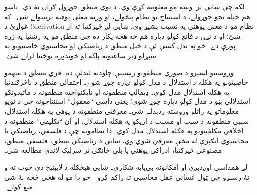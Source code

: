 \documentclass[../../../include/open-logic-section]{subfiles}
\begin{document}


لکه چې ښايي تر اوسه مو معلومه کړې وي، د نوي منطق جوړول ګران نۀ دي۔
تاسو هم خپله نحو جوړولے، د استنتاج يو نظام پنځولے، او ورته معنٰی پوهنه
ترتيبولے شئ۔ که غواړئ د !!{derivation} نظام مو د معنٰی پوهنې په نسبت
بشپړ وي، ښايي لږ ځيرکتيا ته اړ شئ؛ او د نړۍ د قانع کولو دپاره هم څه
هڅه پکار ده چې منطق مو په رښتيا په زړه پورې دے۔ خو په بدل کښې ئې د
خپل منطق د رياضيکي او محاسبوي خاصيتونو په سپړلو ډېر ساعتونه پاکه او
خوندوره بوختيا لرلے شئ۔

وروستيو لسيزو د صوري منطقونو رښتينې چاودنه ليدلې ده۔ فزي منطق د
مبهمو خاصيتونو په هکله د استدلال د مدل کولو دپاره جوړ شوے۔ احتمالي
منطق د ناڅرګندتيا په هکله استدلال مدل کوي۔ ډيفالټ منطقونه او
نايکنواخته منطقونه د ماتېدونکو استدلالي بڼو د مدل کولو دپاره جوړ شوي؛
يعنې داسې ``معقول'' استنتاجونه چې د نويو معلوماتو په راتلو وروسته
ردېدلے شي۔ معرفتي منطقونه د پوهې په هکله استدلال، سببي منطقونه د سبب
او مسبب د اړيکو په هکله استدلال، او آن ``تکليفي'' منطقونه د اخلاقي
مکلفيتونو په هکله استدلال مدل کوي۔ دا نظامونه چې د فلسفي، رياضيکي يا
محاسبوي انګېزې له مخې معرفي شوي وي، ښايي د رياضيکي منطق، فلسفي منطق،
مصنوعي ځيرکتيا، ادراکي پوهنې يا بلې څانګې تر سرليک لاندې مطالعه شي۔

لړ همداسې اوږدېږي او امکانونه بې‌پايه ښکاري۔ ښايي هېڅکله د لايبنېڅ
دې خوب ته و نۀ رسېږو چې ټول انساني عقل محاسبې ته راکم کړو---خو دا مو
له هڅې څخه نۀ شي منع کولے۔
\end{document}
